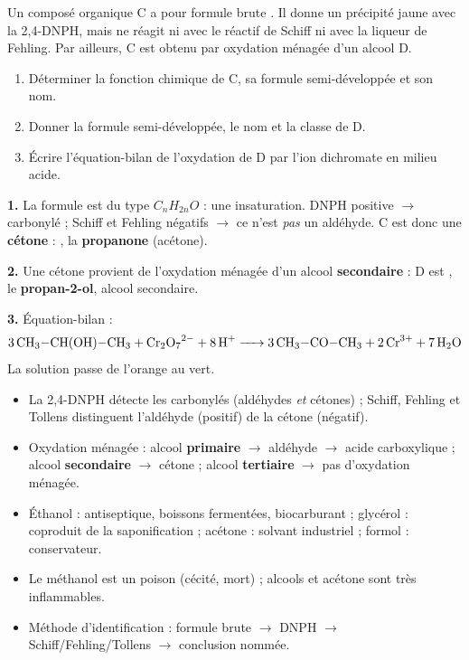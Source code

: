 \documentclass[11pt]{article}
\begin{document}
\begin{exercice}
Un composé organique C a pour formule brute . Il donne un précipité jaune avec la 2,4-DNPH, mais ne réagit ni avec le réactif de Schiff ni avec la liqueur de Fehling. Par ailleurs, C est obtenu par oxydation ménagée d'un alcool D.
\begin{enumerate}
\item Déterminer la fonction chimique de C, sa formule semi-développée et son nom.
\item Donner la formule semi-développée, le nom et la classe de D.
\item Écrire l'équation-bilan de l'oxydation de D par l'ion dichromate en milieu acide.
\end{enumerate}
\end{exercice}

\begin{corrige}
\textbf{1.} La formule  est du type $C_nH_{2n}O$ : une insaturation. DNPH positive $\rightarrow$ carbonylé ; Schiff et Fehling négatifs $\rightarrow$ ce n'est \emph{pas} un aldéhyde. C est donc une \textbf{cétone} : , la \textbf{propanone} (acétone).

\textbf{2.} Une cétone provient de l'oxydation ménagée d'un alcool \textbf{secondaire} : D est , le \textbf{propan-2-ol}, alcool secondaire.

\textbf{3.} Équation-bilan :
\[ \ce{3 CH3-CH(OH)-CH3 + Cr2O7^2- + 8 H+ -> 3 CH3-CO-CH3 + 2 Cr^3+ + 7 H2O} \]
La solution passe de l'orange au vert.
\end{corrige}

\begin{aretenir}
\begin{itemize}
\item La 2,4-DNPH détecte les carbonylés (aldéhydes \emph{et} cétones) ; Schiff, Fehling et Tollens distinguent l'aldéhyde (positif) de la cétone (négatif).
\item Oxydation ménagée : alcool \textbf{primaire} $\rightarrow$ aldéhyde $\rightarrow$ acide carboxylique ; alcool \textbf{secondaire} $\rightarrow$ cétone ; alcool \textbf{tertiaire} $\rightarrow$ pas d'oxydation ménagée.
\item Éthanol : antiseptique, boissons fermentées, biocarburant ; glycérol : coproduit de la saponification ; acétone : solvant industriel ; formol : conservateur.
\item Le méthanol est un poison (cécité, mort) ; alcools et acétone sont très inflammables.
\item Méthode d'identification : formule brute $\rightarrow$ DNPH $\rightarrow$ Schiff/Fehling/Tollens $\rightarrow$ conclusion nommée.
\end{itemize}
\end{aretenir}
\end{document}
